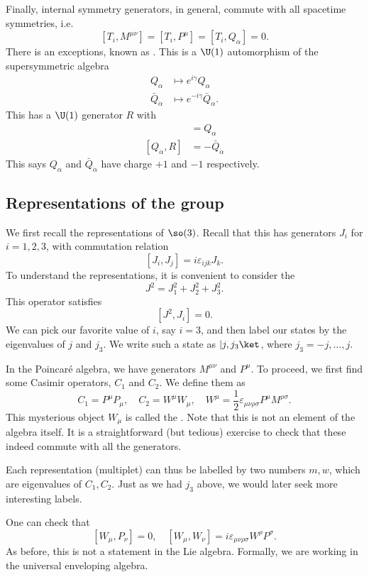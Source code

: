 \documentclass[a4paper]{article}
\begin{document}
Finally, internal symmetry generators, in general, commute with all spacetime symmetries, i.e.
\[
  [T_i, M^{\mu\nu}] = [T_i, P^\mu] = [T_i, Q_\alpha] = 0.
\]
There is an exceptions, known as . This is a $\U(1)$ automorphism of the supersymmetric algebra
\begin{align*}
  Q_\alpha &\mapsto e^{i\gamma} Q_\alpha\\
  \bar{Q}_{\dot\alpha} &\mapsto e^{-i\gamma} \bar{Q}_{\dot\alpha}.
\end{align*}
This has a $\U(1)$ generator $R$ with
\begin{align*}
  [Q_\alpha, R] &= Q_\alpha\\
  [Q_{\dot\alpha}, R] &= -\bar{Q}_{\dot\alpha}
\end{align*}
This says $Q_\alpha$ and $\bar{Q}_{\dot{\alpha}}$ have charge $+1$ and $-1$ respectively.

\subsection{Representations of the  group} %
We first recall the representations of $\so(3)$. Recall that this has generators $J_i$ for $i = 1, 2, 3$, with commutation relation
\[
  [J_i, J_j] = i \varepsilon_{ijk} J_k.
\]
To understand the representations, it is convenient to consider the 
\[
  J^2 = J_1^2 + J_2^2 + J_3^2.
\]
This operator satisfies
\[
  [J^2, J_i] = 0.
\]
We can pick our favorite value of $i$, say $i = 3$, and then label our states by the eigenvalues of $j$ and $j_3$. We write such a state as $|j, j_3\ket$, where $j_3 = -j, \ldots, j$.

In the Poincar\'e algebra, we have generators $M^{\mu\nu}$ and $P^\mu$. To proceed, we first find some Casimir operators, $C_1$ and $C_2$. We define them as
\[
  C_1 = P^\mu P_\mu,\quad C_2 = W^\mu W_\mu,\quad W^\mu = \frac{1}{2} \varepsilon_{\mu\nu\rho\sigma} P^\mu M^{\rho\sigma}.
\]
This mysterious object $W_\mu$ is called the . Note that this is not an element of the algebra itself. It is a straightforward (but tedious) exercise to check that these indeed commute with all the generators.

Each representation (multiplet) can thus be labelled by two numbers $m, w$, which are eigenvalues of $C_1, C_2$. Just as we had $j_3$ above, we would later seek more interesting labels.

One can check that
\[
  [W_\mu, P_\nu] = 0,\quad [W_\mu, W_\nu] = i \varepsilon_{\mu\nu\rho\sigma} W^\rho P^\sigma.
\]
As before, this is not a statement in the Lie algebra. Formally, we are working in the universal enveloping algebra.
\end{document}
